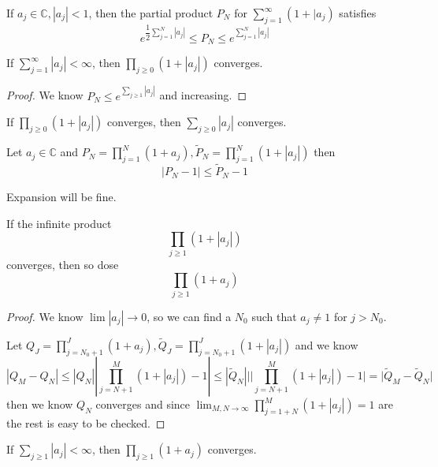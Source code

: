 \documentclass[lang=en, color=blue, ]{elegantbook}
\newcommand{\C}{\mathbb{C}}
\begin{document}
\begin{corollary}
    If $a_j \in \C, |a_j| < 1$, then the partial product $P_N$ for $\sum\limits_{j=1}^{\infty}(1+|a_j)$
    satisfies
    \[
    e^{\dfrac{1}{2}\sum\limits_{j=1}^N|a_j|} \leq  P_N \leq e^{\sum\limits_{j=1}^N|a_j|}
    \]
\end{corollary}

\begin{corollary}
    If $\sum\limits_{j=1}^{\infty} |a_j| < \infty $, then $\prod_{j\geq 0}(1+|a_j|)$ converges.
\end{corollary}
\begin{proof}
    We know $P_N \leq e^{\sum\limits_{j\geq 1}|a_j|}$ and increasing.
\end{proof}

\begin{corollary}
    If $\prod_{j\geq 0}(1+|a_j|)$ converges, then $\sum\limits_{j\geq 0}|a_j|$ converges.
\end{corollary}

\begin{lemma}
    Let $a_j \in \C$ and $P_N = \prod\limits_{j=1}^N (1+a_j), \tilde{P}_N = \prod\limits_{j=1}^N(1+|a_j|)$ then
    \[|P_N - 1| \leq \tilde P_N - 1\]
\end{lemma}
Expansion will be fine.

\begin{theorem}
    If the infinite product
    \[ \prod_{j\geq 1}(1+|a_j|)\]
    converges, then so dose
    \[ \prod_{j\geq 1}(1+a_j)\]
\end{theorem}
\begin{proof}
    We know $\lim |a_j| \to 0$, so we can find a $N_0$ such that $a_j\neq 1$ for $j > N_0$.\par
    Let $Q_J = \prod_{j=N_0+1}^{J}(1+a_j),\tilde{Q}_J = \prod_{j=N_0+1}^{J}(1+|a_j|)$ and we know
    \[
    |Q_M - Q_N| \leq |Q_N||\prod_{j=N+1}^M(1+|a_j|)-1| \leq |\tilde{Q}_N|||\prod_{j=N+1}^M(1+|a_j|)-1| = |\tilde{Q}_M-\tilde{Q}_N|
    \]
    then we know $Q_N$ converges and since $\lim_{M,N\to\infty} \prod_{j=1+N}^M (1+|a_j|) = 1$ are the rest is easy to be checked.
\end{proof}

\begin{corollary}
    If $\sum\limits_{j\geq 1} |a_j| < \infty$, then $\prod_{j\geq 1}(1+a_j)$ converges.
\end{corollary}
\end{document}
